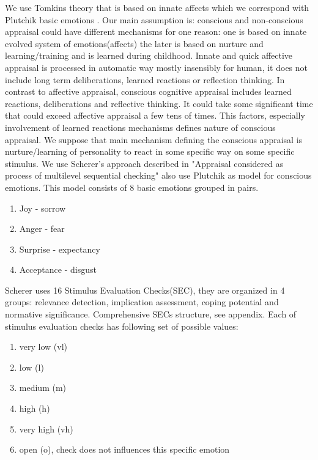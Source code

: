 We use Tomkins theory that is based on innate affects which we correspond with Plutchik basic emotions \cite{natureofemotions}. Our main assumption is: conscious and non-conscious appraisal could have different mechanisms for one reason: one is based on innate evolved system of emotions(affects) the later is based on nurture and learning/training and is learned during childhood. Innate and quick affective appraisal is processed in automatic way mostly insensibly for human, it does not include long term deliberations, learned reactions or reflection thinking. In contrast to affective appraisal, conscious cognitive appraisal includes learned reactions, deliberations and reflective thinking. It could take some significant time that could exceed affective appraisal a few tens of times. This factors, especially involvement of learned reactions mechanisms defines nature of conscious appraisal. We suppose that main mechanism defining the conscious appraisal is nurture/learning of personality to react in some specific way on some specific stimulus. We use Scherer's approach described in "Appraisal considered as process of multilevel sequential checking" \cite{appraisal_considered_as_a_process} also use Plutchik \cite{natureofemotions} as model for conscious emotions. This model consists of 8 basic emotions grouped in pairs.

\begin{enumerate}
 \item  Joy - sorrow
 \item  Anger - fear
 \item  Surprise - expectancy
 \item  Acceptance - disgust
\end{enumerate}

Scherer uses 16 Stimulus Evaluation Checks(SEC), they are organized in 4 groups: relevance detection, implication assessment, coping potential and normative significance. Comprehensive SECs structure, see appendix.
Each of stimulus evaluation checks has following set of possible values:

\begin{enumerate}
 \item  very low (vl)
 \item  low (l)
 \item  medium (m)
 \item  high (h)
 \item  very high (vh)
 \item  open (o), check does not influences this specific emotion
\end{enumerate}

